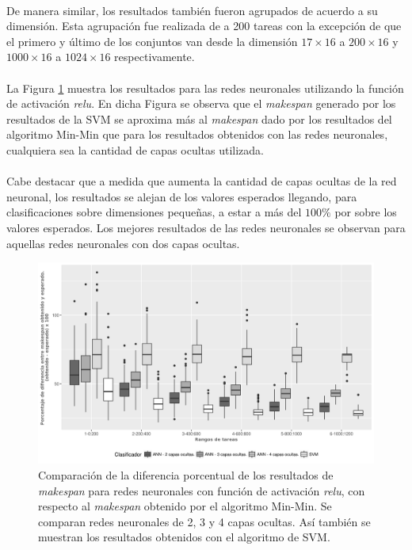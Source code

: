 \paragraph{} De manera similar, los resultados también fueron agrupados de acuerdo a su dimensión.
Esta agrupación fue realizada de a 200 tareas con la excepción de que el primero y último de los conjuntos van desde la dimensión $17\times16$ a $200\times16$ y $1000\times16$ a $1024\times16$ respectivamente.

\paragraph{}La Figura \ref{fig:relu234} muestra los resultados para las redes neuronales utilizando la función de activación \textit{relu}.
En dicha Figura se observa que el \textit{makespan} generado por los resultados de la SVM se aproxima más al \textit{makespan} dado por los resultados del algoritmo Min-Min que para los resultados obtenidos con las redes neuronales, cualquiera sea la cantidad de capas ocultas utilizada. 

\paragraph{} Cabe destacar que a medida que aumenta la cantidad de capas ocultas de la red neuronal, los resultados se alejan de los valores esperados llegando, para clasificaciones sobre dimensiones pequeñas, a estar a más del $100\%$ por sobre los valores esperados.
Los mejores resultados de las redes neuronales se observan para aquellas redes neuronales con dos capas ocultas.


\begin{figure}[H]
  \centering
  \includegraphics[width=\columnwidth]{imagenes/comparacion_anns_relu.png}
  \caption{Comparación de  la diferencia porcentual  de los resultados de \textit{makespan} para redes neuronales con función de activación \textit{relu}, con respecto al \textit{makespan} obtenido por el algoritmo Min-Min.
Se comparan redes neuronales de 2, 3 y 4 capas ocultas.
Así también se muestran los resultados obtenidos con el algoritmo de SVM.}
  \label{fig:relu234}
\end{figure}

